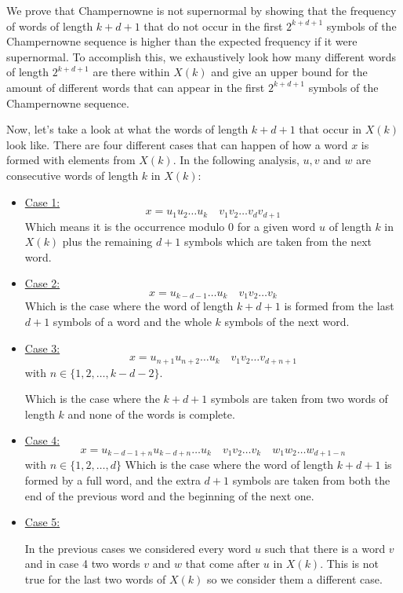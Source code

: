 \documentclass[11pt,a4paper]{tesis}
\theoremstyle{definition}
\begin{document}
We prove that Champernowne is not supernormal by showing that the frequency of words of length $k+d+1$ that do not occur in the first $2^{k+d+1}$ symbols of the Champernowne sequence is higher than the expected frequency if it were supernormal.
To accomplish this, we exhaustively look how many different words of length $2^{k+d+1}$ are there within $X(k)$ and give an upper bound for the amount of different words that can appear in the first $2^{k+d+1}$ symbols of the Champernowne sequence.

Now, let's take a look at what the words of length $k + d + 1$ that occur in $X(k)$ look like. There are four different cases that can happen of how a word $x$ is formed with elements from $X(k)$. 
In the following analysis, $u, v$ and $w$ are consecutive words of length $k$ in $X(k)$:

\begin{itemize}
  \item \underline{Case 1:} 
  $$x = u_1 u_2 \dots u_k \quad v_1 v_2 \dots v_{d} v_{d + 1}$$
    Which means it is the occurrence modulo 0 for a given word $u$ of length $k$ in $X(k)$ plus the remaining $d + 1$ symbols which are taken from the next word.

  \item \underline{Case 2:} 
  $$ x = u_{k-d-1} \dots u_k \quad v_1 v_2 \dots v_k$$
  Which is the case where the word of length $k + d + 1$ is formed from the last $d + 1$ symbols of a word and the whole $k$ symbols of the next word.

  \item \underline{Case 3:} 
  $$x = u_{n+1} u_{n+2} \dots u_k \quad  v_1 v_2 \dots v_{d+n+1} $$
with $n \in \{1,2,\dots ,k - d - 2\}$.

   Which is the case where the $k + d + 1$ symbols are taken from two words of length $k$ and none of the words is complete.

  
  \item \underline{Case 4:} 
  $$ x = u_{k-d-1+n} u_{k-d+n} \dots u_k \quad v_1 v_2 \dots v_k \quad w_1 w_2 \dots w_{d+1-n}$$
  with $n \in \{1, 2, \dots , d\}$
  Which is the case where the word of length $k + d + 1$ is formed by a full word, and the extra $d + 1$ symbols are taken from both the end of the previous word and the beginning of the next one.

  \item \underline{Case 5:} 
  
   In the previous cases we considered every word $u$ such that there is a word $v$ and in case 4 two words $v$ and $w$ that come after $u$ in $X(k)$. This is not true for the last two words of $X(k)$ so we consider them a different case.
  

\end{itemize}
\end{document}
